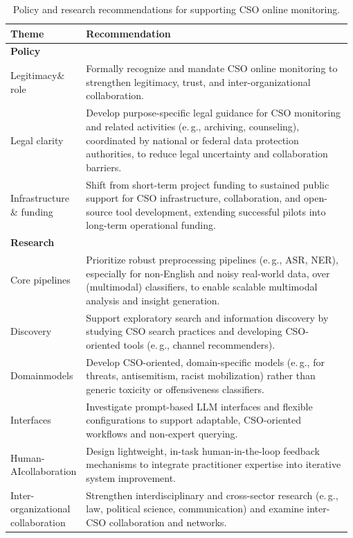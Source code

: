 \documentclass[acmsmall]{acmart}
\begin{document}
\begin{table}[h]
\centering
\small
\begin{tabular}{p{0.13\linewidth} p{0.85\linewidth}}
\toprule
\textbf{Theme} & \textbf{Recommendation} \\
\midrule
\multicolumn{2}{l}{\textbf{Policy}}\\
\addlinespace[2pt]
Legitimacy\newline \& role &
Formally recognize and mandate CSO online monitoring to strengthen legitimacy, trust, and inter-organizational collaboration.\\

Legal clarity &
Develop purpose-specific legal guidance for CSO monitoring and related activities (e.\,g., archiving, counseling), coordinated by national or federal data protection authorities, to reduce legal uncertainty and collaboration barriers.\\

Infrastructure \& funding &
Shift from short-term project funding to sustained public support for CSO infrastructure, collaboration, and open-source tool development, extending successful pilots into long-term operational funding.\\

\midrule
\multicolumn{2}{l}{\textbf{Research}}\\
\addlinespace[2pt]
Core pipelines &
Prioritize robust preprocessing pipelines (e.\,g., ASR, NER), especially for non-English and noisy real-world data, over (multimodal) classifiers, to enable scalable multimodal analysis and insight generation.\\

Discovery &
Support exploratory search and information discovery by studying CSO search practices and developing CSO-oriented tools (e.\,g., channel recommenders).\\

Domain\newline models &
Develop CSO-oriented, domain-specific models (e.\,g., for threats, antisemitism, racist mobilization) rather than generic toxicity or offensiveness classifiers.\\

Interfaces &
Investigate prompt-based LLM interfaces and flexible configurations to support adaptable, CSO-oriented workflows and non-expert querying.\\

Human-AI\newline collaboration &
Design lightweight, in-task human-in-the-loop feedback mechanisms to integrate practitioner expertise into iterative system improvement.\\

Inter-organizational collaboration &
Strengthen interdisciplinary and cross-sector research (e.\,g., law, political science, communication) and examine inter-CSO collaboration and networks.\\
\bottomrule
\end{tabular}
\caption{Policy and research recommendations for supporting CSO online monitoring.}
\label{tab:policy_research_implications}
\end{table}
\end{document}
